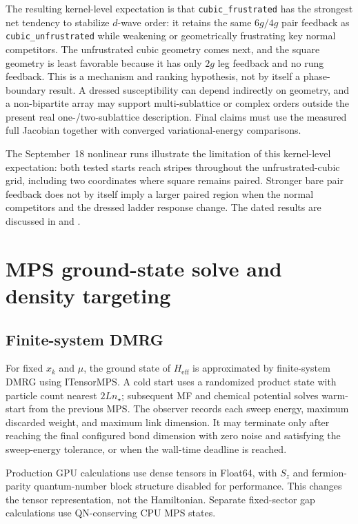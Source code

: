 \documentclass[11pt]{article}
\newcommand{\Heff}{H_{\mathrm{eff}}}
\begin{document}
The resulting kernel-level expectation is that
\texttt{cubic\_frustrated} has the strongest net tendency to stabilize
\(d\)-wave order: it retains the same \(6g/4g\) pair feedback as
\texttt{cubic\_unfrustrated} while weakening or geometrically frustrating key
normal competitors.  The unfrustrated cubic geometry comes next, and the square
geometry is least favorable because it has only \(2g\) leg feedback and no
rung feedback.  This is a mechanism and ranking hypothesis, not by itself a
phase-boundary result.  A dressed susceptibility can depend indirectly on
geometry, and a non-bipartite array may support multi-sublattice or complex
orders outside the present real one-/two-sublattice description.  Final claims
must use the measured full Jacobian together with converged variational-energy
comparisons.

The September~18 nonlinear runs illustrate the limitation of this
kernel-level expectation: both tested starts reach stripes throughout the
unfrustrated-cubic grid, including two coordinates where square remains
paired. Stronger bare pair feedback does not by itself imply a larger paired
region when the normal competitors and the dressed ladder response change.
The dated results are discussed in
 and
.

\section{MPS ground-state solve and density targeting}

\subsection{Finite-system DMRG}

For fixed \(x_k\) and \(\mu\), the ground state of \(\Heff\) is approximated by
finite-system DMRG using ITensorMPS.  A cold start uses a randomized product
state with particle count nearest \(2Ln_\star\); subsequent MF and chemical
potential solves warm-start from the previous MPS.  The observer records each
sweep energy, maximum discarded weight, and maximum link dimension.  It may
terminate only after reaching the final configured bond dimension with zero
noise and satisfying the sweep-energy tolerance, or when the wall-time
deadline is reached.

Production GPU calculations use dense tensors in Float64, with \(S_z\) and
fermion-parity quantum-number block structure disabled for performance.  This
changes the tensor representation, not the Hamiltonian.  Separate fixed-sector
gap calculations use QN-conserving CPU MPS states.
\end{document}
